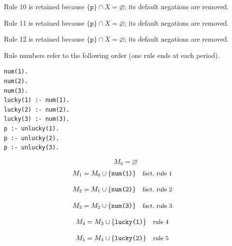 \documentclass[a4paper,11pt]{article}
\newif\ifexplain
\newcommand{\explain}[1]{\ifexplain\begin{erklbox}#1\end{erklbox}\fi}
\newcommand{\why}[1]{\text{\small #1}}
\newcommand{\at}[1]{\texttt{#1}}
\begin{document}
Rule 10 is retained because $\{\at{p}\}\cap X=\varnothing$; its default negations are removed.

Rule 11 is retained because $\{\at{p}\}\cap X=\varnothing$; its default negations are removed.

Rule 12 is retained because $\{\at{p}\}\cap X=\varnothing$; its default negations are removed.

Rule numbers refer to the following order (one rule ends at each period).
\begin{small}
\begin{verbatim}
num(1).
num(2).
num(3).
lucky(1) :- num(1).
lucky(2) :- num(2).
lucky(3) :- num(3).
p :- unlucky(1).
p :- unlucky(2).
p :- unlucky(3).
\end{verbatim}
\end{small}
\explain{Beim Redukt bleibt die Kandidatenmenge fest. Wir entscheiden zuerst, welche Regeln wegfallen. Erst danach berechnen wir aus den verbleibenden positiven Regeln die kleinste abgeschlossene Menge. Ein Modell allein reicht nicht: Diese Menge muss genau der Kandidat sein.}
\[
M_0=\varnothing
\]
\begin{align*}
M_{1} &= M_{0}\cup \{\at{num(1)}\} && \why{fact, rule 1}
\end{align*}
\explain{Diese Regel hat keinen Körper. Ihr Kopf $\at{num(1)}$ ist damit ein Fakt und muss in die Menge.}
\begin{align*}
M_{2} &= M_{1}\cup \{\at{num(2)}\} && \why{fact, rule 2}
\end{align*}
\explain{Diese Regel hat keinen Körper. Ihr Kopf $\at{num(2)}$ ist damit ein Fakt und muss in die Menge.}
\begin{align*}
M_{3} &= M_{2}\cup \{\at{num(3)}\} && \why{fact, rule 3}
\end{align*}
\explain{Diese Regel hat keinen Körper. Ihr Kopf $\at{num(3)}$ ist damit ein Fakt und muss in die Menge.}
\begin{align*}
M_{4} &= M_{3}\cup \{\at{lucky(1)}\} && \why{rule 4}
\end{align*}
\explain{Für $\at{lucky(1)}$ brauchen wir $\at{num(1)}$. Weil diese Voraussetzungen bereits hergeleitet sind, dürfen wir den Regelkopf jetzt aufnehmen und alle bisherigen Atome behalten; bei einer fehlenden Voraussetzung würde diese Regel dagegen noch nichts beitragen.}
\begin{align*}
M_{5} &= M_{4}\cup \{\at{lucky(2)}\} && \why{rule 5}
\end{align*}
\explain{Für $\at{lucky(2)}$ brauchen wir $\at{num(2)}$. Weil diese Voraussetzungen bereits hergeleitet sind, dürfen wir den Regelkopf jetzt aufnehmen und alle bisherigen Atome behalten; bei einer fehlenden Voraussetzung würde diese Regel dagegen noch nichts beitragen.}
\end{document}
